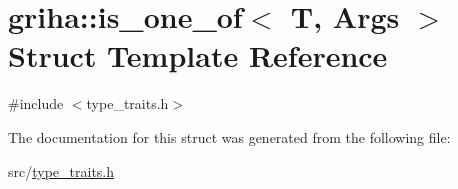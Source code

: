\hypertarget{structgriha_1_1is__one__of}{}\section{griha\+:\+:is\+\_\+one\+\_\+of$<$ T, Args $>$ Struct Template Reference}
\label{structgriha_1_1is__one__of}


{\ttfamily \#include $<$type\+\_\+traits.\+h$>$}



The documentation for this struct was generated from the following file\+:\begin{DoxyCompactItemize}
\item 
src/\hyperlink{type__traits_8h}{type\+\_\+traits.\+h}\end{DoxyCompactItemize}
